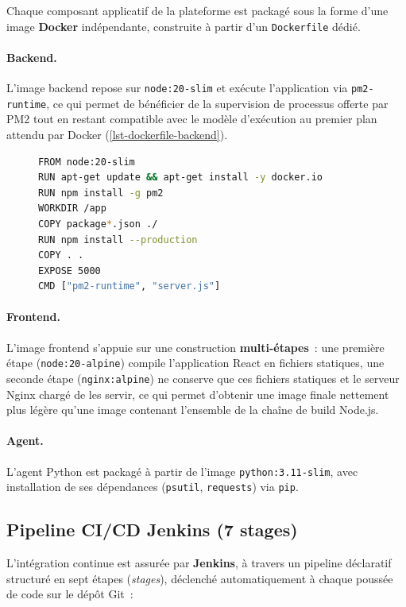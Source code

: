 Chaque composant applicatif de la plateforme est packagé sous la forme d'une image \textbf{Docker} indépendante, construite à partir d'un \texttt{Dockerfile} dédié.

\paragraph{Backend.} L'image backend repose sur \texttt{node:20-slim} et exécute l'application via \texttt{pm2-runtime}, ce qui permet de bénéficier de la supervision de processus offerte par PM2 tout en restant compatible avec le modèle d'exécution au premier plan attendu par Docker (\cref{lst-dockerfile-backend}).

\begin{figure}[H]
\begin{lstlisting}[language=bash,caption={Dockerfile du backend},label={lst-dockerfile-backend}]
FROM node:20-slim
RUN apt-get update && apt-get install -y docker.io
RUN npm install -g pm2
WORKDIR /app
COPY package*.json ./
RUN npm install --production
COPY . .
EXPOSE 5000
CMD ["pm2-runtime", "server.js"]
\end{lstlisting}
\end{figure}

\paragraph{Frontend.} L'image frontend s'appuie sur une construction \textbf{multi-étapes}~: une première étape (\texttt{node:20-alpine}) compile l'application React en fichiers statiques, une seconde étape (\texttt{nginx:alpine}) ne conserve que ces fichiers statiques et le serveur Nginx chargé de les servir, ce qui permet d'obtenir une image finale nettement plus légère qu'une image contenant l'ensemble de la chaîne de build Node.js.

\paragraph{Agent.} L'agent Python est packagé à partir de l'image \texttt{python:3.11-slim}, avec installation de ses dépendances (\texttt{psutil}, \texttt{requests}) via \texttt{pip}.

\subsection{Pipeline CI/CD Jenkins (7 stages)}

L'intégration continue est assurée par \textbf{Jenkins}, à travers un pipeline déclaratif structuré en sept étapes (\emph{stages}), déclenché automatiquement à chaque poussée de code sur le dépôt Git~:

